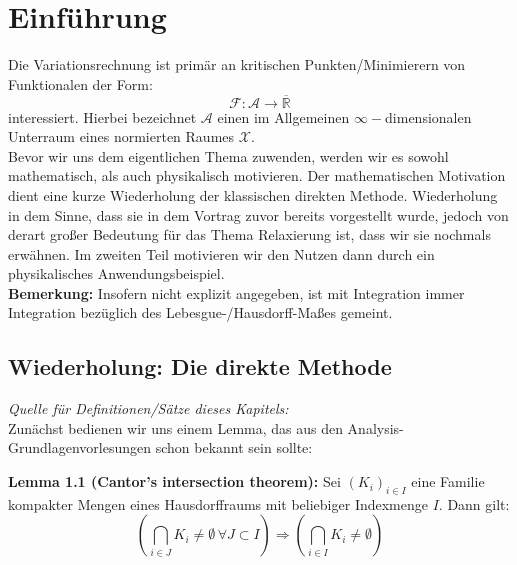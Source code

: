 \chapter{Einführung}
Die Variationsrechnung ist primär an kritischen Punkten/Minimierern von Funktionalen der Form:
\begin{equation}
    \mathcal{F}: \mathcal{A} \to \overline{\mathbb{R}}
\end{equation}
interessiert. Hierbei bezeichnet \(\mathcal{A}\) einen im Allgemeinen \(\infty-\)dimensionalen Unterraum eines normierten Raumes \(\mathcal{X}\).\\
Bevor wir uns dem eigentlichen Thema zuwenden, werden wir es sowohl mathematisch, als auch physikalisch motivieren. Der mathematischen Motivation dient eine kurze Wiederholung der klassischen direkten Methode. Wiederholung in dem Sinne, dass sie in dem Vortrag zuvor bereits vorgestellt wurde, jedoch von derart großer Bedeutung für das Thema Relaxierung ist, dass wir sie nochmals erwähnen. Im zweiten Teil motivieren wir den Nutzen dann durch ein physikalisches Anwendungsbeispiel.\\

\textbf{Bemerkung:} Insofern nicht explizit angegeben, ist mit Integration immer Integration bezüglich des Lebesgue-/Hausdorff-Maßes gemeint.\\
\section{Wiederholung: Die direkte Methode}
\textit{Quelle für Definitionen/Sätze dieses Kapitels: \cite{CalcVar}}\\[0.1cm]
Zunächst bedienen wir uns einem Lemma, das aus den Analysis-\\Grundlagenvorlesungen schon bekannt sein sollte:\\
\colorbox{lemyellow}{\begin{minipage}{16cm}{\textcolor{black}{}{\label{lem1.1}}}
\textbf{Lemma 1.1 (Cantor's intersection theorem):} Sei \((K_i)_{i \in I}\) eine Familie kompakter Mengen eines Hausdorffraums mit beliebiger Indexmenge \(I\). Dann gilt:
\begin{equation}
    (\bigcap_{i \in J} K_i \neq \emptyset \, \forall J \subset I) \Rightarrow (\bigcap_{i \in I} K_i \neq \emptyset)
\end{equation}
\end{minipage}}

